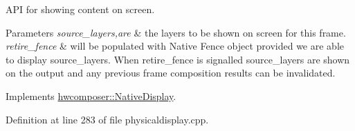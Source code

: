 A\+PI for showing content on screen. 
\begin{DoxyParams}{Parameters}
{\em source\+\_\+layers,are} & the layers to be shown on screen for this frame. \\
\hline
{\em retire\+\_\+fence} & will be populated with Native Fence object provided we are able to display source\+\_\+layers. When retire\+\_\+fence is signalled source\+\_\+layers are shown on the output and any previous frame composition results can be invalidated. \\
\hline
\end{DoxyParams}


Implements \mbox{\hyperlink{classhwcomposer_1_1NativeDisplay_a4825b8bc4b85e03b396ed6d2cf5bd8c0}{hwcomposer\+::\+Native\+Display}}.



Definition at line 283 of file physicaldisplay.\+cpp.


